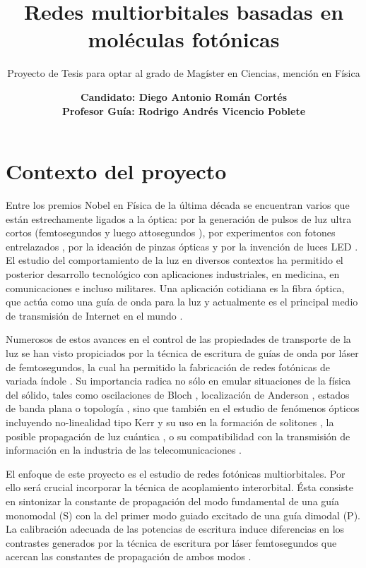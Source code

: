 \documentclass{article}
\date{\textbf{Candidato: Diego Antonio Román Cortés\\ Profesor Guía: Rodrigo Andrés Vicencio Poblete}}
\author{Proyecto de Tesis para optar al grado de Magíster en Ciencias, mención en Física}
\title{Redes multiorbitales basadas en moléculas fotónicas}
\begin{document}
 \maketitle

\section{Contexto del proyecto}

Entre los premios Nobel en Física de la última década \cite{nobel} se encuentran varios que están estrechamente ligados a la óptica: por la generación de pulsos de luz ultra cortos (femtosegundos \cite{femto1} y luego attosegundos \cite{atto1, atto2, atto3}), por experimentos con fotones entrelazados \cite{photons1, photons2, photons3}, por la ideación de pinzas ópticas \cite{opticaltweezers} y por la invención de luces LED \cite{led1, led2, led3}. El estudio del comportamiento de la luz en diversos contextos ha permitido el posterior desarrollo tecnológico con aplicaciones industriales, en medicina, en comunicaciones e incluso militares. Una aplicación cotidiana es la fibra óptica, que actúa como una guía de onda para la luz y actualmente es el principal medio de transmisión de Internet en el mundo \cite{fibra2, fibra}. 
	
	Numerosos de estos avances en el control de las propiedades de transporte de la luz se han visto propiciados por la técnica de escritura de guías de onda por láser de femtosegundos, la cual ha permitido la fabricación de redes fotónicas de variada índole \cite{femto, bics, lieb1, lieb2, artificialFB, FBdynamics, strain, dendritas, splitters}. Su importancia radica no sólo en emular situaciones de la física del sólido, tales como oscilaciones de Bloch \cite{BlochOsci}, localización de Anderson \cite{Anderson}, estados de banda plana \cite{lieb1, lieb2, artificialFB, FBdynamics} o topología \cite{obstopo, obsfloquet, topo1dphoto,toporusos}, sino que también en el estudio de fenómenos ópticos incluyendo no-linealidad tipo Kerr y su uso en la formación de solitones \cite{discretesolitons}, la posible propagación de luz cuántica \cite{qed, squeezed, topoquantum}, o su compatibilidad con la transmisión de información en la industria de las telecomunicaciones \cite{telecom}.
	
	El enfoque de este proyecto es el estudio de redes fotónicas multiorbitales. Por ello será crucial incorporar la técnica de acoplamiento interorbital. Ésta consiste en sintonizar la constante de propagación del modo fundamental de una guía monomodal (S) con la del primer modo guiado excitado de una guía dimodal (P). La calibración adecuada de las potencias de escritura induce diferencias en los contrastes generados por la técnica de escritura por láser femtosegundos que acercan las constantes de propagación de ambos modos \cite{interorbital}.
	
\end{document}
